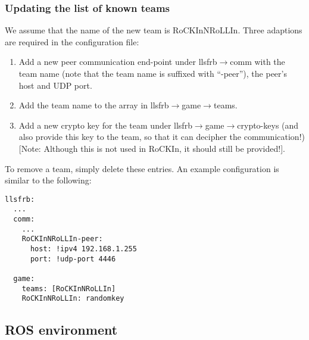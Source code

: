 \documentclass{article}
\begin{document}
\subsubsection{Updating the list of known teams}
We assume that the name of the new team is RoCKInNRoLLIn. Three adaptions are required in the configuration file:
\begin{enumerate}
  \item Add a new peer communication end-point under llsfrb$\rightarrow$comm with the team name (note that the team
  name is suffixed with ``-peer''), the peer's host and UDP port.
  \item Add the team name to the array in llsfrb$\rightarrow$game$\rightarrow$teams.
  \item Add a new crypto key for the team under llsfrb$\rightarrow$game$\rightarrow$crypto-keys (and also provide this 
  key to the team, so that it can decipher the communication!) [Note: Although this is not used in RoCKIn, it should
  still be provided!].
\end{enumerate}
To remove a team, simply delete these entries. An example configuration is similar to the following:
\begin{lstlisting}
llsfrb:
  ...
  comm:
    ...
    RoCKInNRoLLIn-peer:
      host: !ipv4 192.168.1.255
      port: !udp-port 4446

  game:
    teams: [RoCKInNRoLLIn]
    RoCKInNRoLLIn: randomkey
\end{lstlisting}

\subsection{ROS environment}
\end{document}
